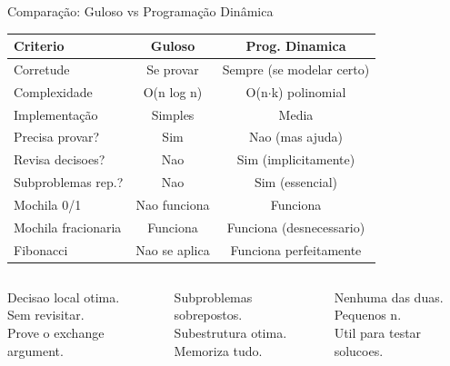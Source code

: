 \documentclass[aspectratio=169,10pt]{beamer}
\begin{document}
\begin{frame}[shrink=2]{Comparação: Guloso vs Programação Dinâmica}
  \begin{tcolorbox}[caixaAzul,title={Quando usar cada paradigma?}]
    \centering\footnotesize
    \begin{tabular}{lcc}
      \toprule
      \textbf{Criterio} & \textbf{Guloso} & \textbf{Prog. Dinamica}\\
      \midrule
      Corretude          & Se provar     & Sempre (se modelar certo)\\
      Complexidade       & O(n log n)    & O(n$\cdot$k) polinomial\\
      Implementação      & Simples       & Media\\
      Precisa provar?    & Sim           & Nao (mas ajuda)\\
      Revisa decisoes?   & Nao           & Sim (implicitamente)\\
      Subproblemas rep.? & Nao           & Sim (essencial)\\
      Mochila 0/1        & Nao funciona  & Funciona\\
      Mochila fracionaria& Funciona      & Funciona (desnecessario)\\
      Fibonacci          & Nao se aplica & Funciona perfeitamente\\
      \bottomrule
    \end{tabular}
  \end{tcolorbox}
  \vspace{0.10cm}
  \begin{columns}[t]
      \begin{tcolorbox}[caixaDourada,title={Guloso}]
        \footnotesize
        Decisao local otima.\\
        Sem revisitar.\\
        Prove o exchange argument.
      \end{tcolorbox}
      \begin{tcolorbox}[caixaDP,title={Programação Dinâmica}]
        \footnotesize
        Subproblemas sobrepostos.\\
        Subestrutura otima.\\
        Memoriza tudo.
      \end{tcolorbox}
      \begin{tcolorbox}[caixaVermelho,title={Forca Bruta}]
        \footnotesize
        Nenhuma das duas.\\
        Pequenos n.\\
        Util para testar solucoes.
      \end{tcolorbox}
  \end{columns}
\end{frame}
\end{document}

